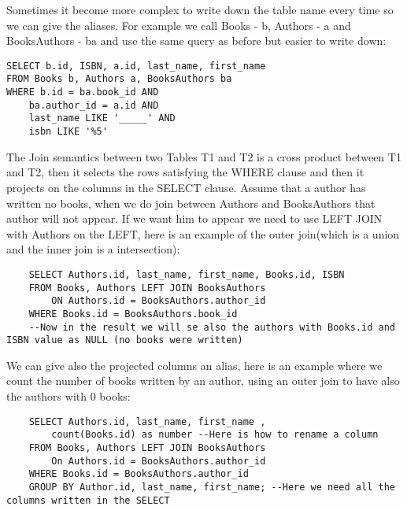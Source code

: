 \documentclass[a4page, 11pt]{article}
\begin{document}
Sometimes it become more complex to write down the table name every time so we can give the aliases. For example we call Books - b, Authors - a and BooksAuthors - ba and use the same query as before but easier to write down:
\begin{lstlisting}
SELECT b.id, ISBN, a.id, last_name, first_name
FROM Books b, Authors a, BooksAuthors ba
WHERE b.id = ba.book_id AND
	ba.author_id = a.id AND	
	last_name LIKE '_____' AND
	isbn LIKE '%5'
\end{lstlisting}
The Join semantics between two Tables T1 and T2 is a cross product between T1 and T2, then it selects the rows satisfying the WHERE clause and then it projects on the columns in the SELECT clause.\newline
Assume that a author has written no books, when we do join between Authors and BooksAuthors that author will not appear. 
If we want him to appear we need to use LEFT JOIN with Authors on the LEFT, here is an example of the outer join(which is a union and the inner join is a intersection):
\begin{lstlisting}
	SELECT Authors.id, last_name, first_name, Books.id, ISBN
	FROM Books, Authors LEFT JOIN BooksAuthors
		ON Authors.id = BooksAuthors.author_id
	WHERE Books.id = BooksAuthors.book_id
	--Now in the result we will se also the authors with Books.id and ISBN value as NULL (no books were written)
\end{lstlisting}

We can give also the projected columns an alias, here is an example where we count the number of books written by an author, using an outer join to have also the authors with 0 books:
\begin{lstlisting}
	SELECT Authors.id, last_name, first_name ,
		count(Books.id) as number --Here is how to rename a column
	FROM Books, Authors LEFT JOIN BooksAuthors
		On Authors.id = BooksAuthors.author_id
	WHERE Books.id = BooksAuthors.author_id
	GROUP BY Author.id, last_name, first_name; --Here we need all the columns written in the SELECT
\end{lstlisting}
\pagebreak
\end{document}

